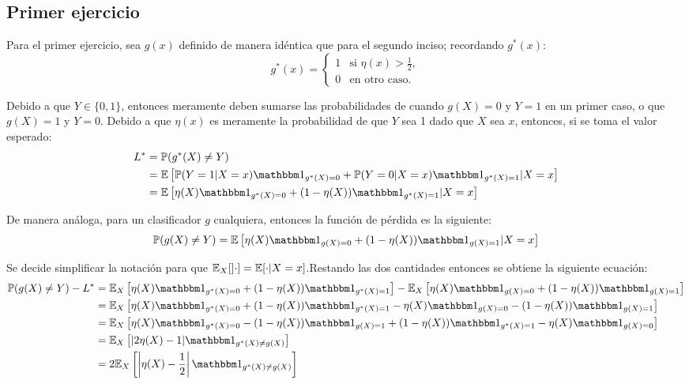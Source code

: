 \subsection*{Primer ejercicio}
Para el primer ejercicio, sea $g(x)$ definido de manera idéntica que para el segundo inciso;
    recordando $g^*(x)$:
    \begin{equation}
        g^*(x) = \begin{cases}
            1 & \text{si }{\eta}(x) >\frac{1}{2}, \\
            0 & \text{en otro caso.}
        \end{cases}
    \end{equation}

    Debido a que $Y\in\{0,1\}$, entonces meramente deben sumarse las probabilidades de cuando 
    $g(X) = 0$ y $Y=1$ en un primer caso, o que $g(X) = 1$ y $Y=0$. Debido a que $\eta(x)$ es 
    meramente la probabilidad de que $Y$ sea 1 dado que $X$ sea $x$, entonces, si se toma 
    el valor esperado: 
    \begin{align}
        L^* &=\P(g^*(X)\ne Y) \\
        &= \E\left[\P(Y=1|X=x)\ind[g^*(X)=0]+\P(Y=0|X=x)\ind[g^*(X)=1]|X=x\right] \\
        &= \E\left[\eta(X)\ind[g^*(X)=0]+(1-\eta(X))\ind[g^*(X)=1]|X=x\right]
    \end{align}

    De manera análoga, para un clasificador $g$ cualquiera, entonces la función de pérdida es la siguiente: 
    \begin{equation}
        \P(g(X)\ne Y) = \E\left[\eta(X)\ind[g(X)=0]+(1-\eta(X))\ind[g(X)=1]|X=x\right]
    \end{equation}

    Se decide simplificar la notación para que $\mathbb{E}_X[]\cdot] = \mathbb{E}[\cdot|X=x]$.Restando las dos cantidades entonces se obtiene la siguiente ecuación:
    \begin{align}
        \P(g(X)\ne Y) - L^* &=
        \E_X\left[\eta(X)\ind[g^*(X)=0]+(1-\eta(X))\ind[g^*(X)=1]\right] -
        \E_X\left[\eta(X)\ind[g(X)=0]+(1-\eta(X))\ind[g(X)=1]\right]    \\ 
        &=
        \E_X\left[\eta(X)\ind[g^*(X)=0]+(1-\eta(X))\ind[g^*(X)=1] -
        \eta(X)\ind[g(X)=0]-(1-\eta(X))\ind[g(X)=1]\right]\label{eq:linear1}  \\
        &= 
        \E_X\left[\eta(X)\ind[g^*(X)=0] - (1-\eta(X))\ind[g(X)=1] + (1-\eta(X))\ind[g^*(X)=1] -
        \eta(X)\ind[g(X)=0]\right]\label{eq:gX} \\
        &= 
        \E_X\left[|2\eta(X)-1|\ind[g^*(X)\ne g(X)]\right] \\
        &=
        2\E_X\left[\left|\eta(X)-\frac{1}{2}\right|\ind[g^*(X)\ne g(X)]\right]\label{eq:linear2}
    \end{align}

